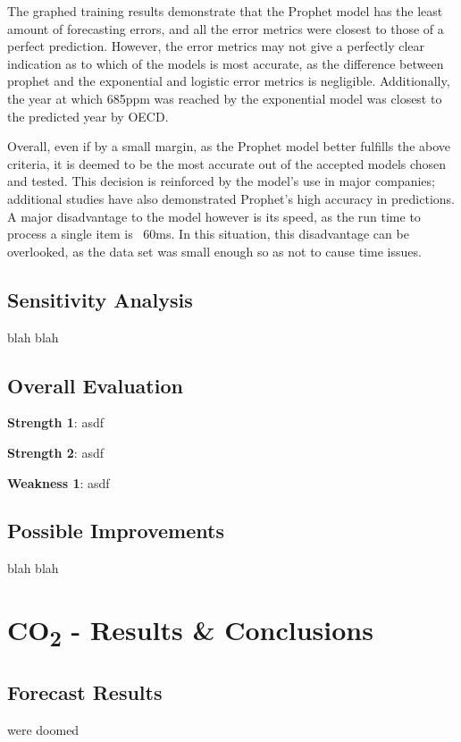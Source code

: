 \documentclass[12pt]{mcmthesis}
\begin{document}
    The graphed training results demonstrate that the Prophet model has the least amount of forecasting errors, and all the error metrics were closest to those of a perfect prediction. However, the error metrics may not give a perfectly clear indication as to which of the models is most accurate, as the difference between prophet and the exponential and logistic error metrics is negligible. Additionally, the year at which 685ppm was reached by the exponential model was closest to the predicted year by OECD.

    Overall, even if by a small margin, as the Prophet model better fulfills the above criteria, it is deemed to be the most accurate out of the accepted models chosen and tested. This decision is reinforced by the model’s use in major companies; additional studies have also demonstrated Prophet’s high accuracy in predictions. A major disadvantage to the model however is its speed, as the run time to process a single item is ~60ms. In this situation, this disadvantage can be overlooked, as the data set was small enough so as not to cause time issues.


    \subsection{Sensitivity Analysis}
    blah blah


    \subsection{Overall Evaluation}

    \noindent\textbf{Strength 1}: asdf

    \noindent\textbf{Strength 2}: asdf

    \noindent\textbf{Weakness 1}: asdf


    \subsection{Possible Improvements}
    blah blah



    \section{CO\textsubscript{2} - Results \& Conclusions}

    \subsection{Forecast Results}
    we\textquotesingle re doomed
\end{document}
